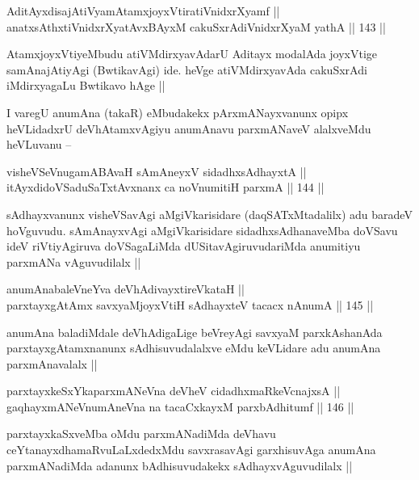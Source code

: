
\begin{shl}
AditAyxdisajAtiVyamAtamxjoyxVtiratiVnidxrXyamf || \\
anatxsAthxtiVnidxrXyatAvxBAyxM cakuSxrAdiVnidxrXyaM yathA ||  143 ||  
\end{shl}

\begin{artha}
AtamxjoyxVtiyeMbudu atiVMdirxyavAdarU Aditayx modalAda joyxVtige samAnajAtiyAgi (BwtikavAgi) ide. heVge atiVMdirxyavAda cakuSxrAdi iMdirxyagaLu Bwtikavo hAge ||

I varegU anumAna (takaR) eMbudakekx pArxmANayxvanunx opipx heVLidadxrU deVhAtamxvAgiyu anumAnavu parxmANaveV alalxveMdu heVLuvanu --
\end{artha}

\begin{shl}
visheVSeV\s nugamABAvaH sAmAneyxV sidadhxsAdhayxtA || \\
itAyxdidoVSaduSaTxtAvxnanx ca noV\s numitiH parxmA ||  144 ||  
\end{shl}

\begin{artha}
sAdhayxvanunx visheVSavAgi aMgiVkarisidare (daqSATxMtadalilx) adu baradeV hoVguvudu. sAmAnayxvAgi aMgiVkarisidare sidadhxsAdhanaveMba doVSavu ideV riVtiyAgiruva doVSagaLiMda dUSitavAgiruvudariMda anumitiyu parxmANa vAguvudilalx ||
\end{artha}

\begin{shl}
anumAnabaleVneYva deVhAdivayxtireVkataH || \\
parxtayxgAtAmx savxyaMjoyxVtiH sAdhayxteV tacacx nAnumA ||  145 ||  
\end{shl}

\begin{artha}
anumAna baladiMdale deVhAdigaLige beVreyAgi savxyaM parxkAshanAda parxtayxgAtamxnanunx sAdhisuvudalalxve eMdu keVLidare adu anumAna parxmAnavalalx ||
\end{artha}

\begin{shl}
parxtayxkeSxYkaparxmANeVna deVheV cidadhxmaRkeV\s cnajxsA || \\
gaqhayxmANeV\s numAneVna na tacaCxkayxM parxbAdhitumf ||  146 ||  
\end{shl}

\begin{artha}
parxtayxkaSxveMba oMdu parxmANadiMda deVhavu ceYtanayxdhamaRvuLaLxdedxMdu savxrasavAgi garxhisuvAga anumAna parxmANadiMda adanunx bAdhisuvudakekx sAdhayxvAguvudilalx ||
\end{artha}

